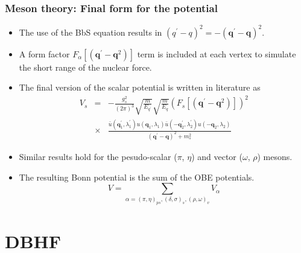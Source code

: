 \documentclass[10pt,serif]{beamer}
\newcommand{\bvec}[1]{\boldsymbol{#1}}
\newcommand{\rb}[1]{\left(#1\right)}
\begin{document}
\begin{frame}
\frametitle{Meson theory: Final form for the potential}
\begin{itemize}
\item The use of the BbS equation results in $\rb{q^\prime - q}^2=-\rb{\bvec{q}^\prime-\bvec{q}}^2$.
\item A form factor $F_\alpha \left[ \rb{\bvec{q}^\prime - \bvec{q}^2} \right]$ term is included at each vertex to simulate the short range of the nuclear force.
\item The final version of the scalar potential is written in literature as
\begin{eqnarray}
V_{s}&=&-\frac{g^2_{s}}{\rb{2 \pi}^3} \sqrt{\frac{m}{E_{q^\prime}}} \sqrt{\frac{m}{E_{q}}} \rb{F_s \left[ \rb{\bvec{q}^\prime - \bvec{q}^2} \right] }^2 \nonumber \\
&\times&\frac{\bar{u} \rb{\bvec{q}_1^\prime,\lambda_1^\prime} u \rb{\bvec{q}_1,\lambda_1} \bar{u} \rb{\bvec{-q}_2^\prime,\lambda_2^\prime} u \rb{\bvec{-q}_2,\lambda_2}}{(\bvec{q}^\prime - \bvec{q})^2 + m^2_{s}}
\end{eqnarray}
\item Similar results hold for the pesudo-scalar ($\pi$, $\eta$) and vector ($\omega$, $\rho$) mesons.
\item The resulting Bonn potential is the sum of the OBE potentials.
\begin{equation}
V = \sum_{\alpha=\rb{\pi,\eta}_{ps},\rb{\delta,\sigma}_{s},\rb{\rho,\omega}_{v}} V_{\alpha}
\end{equation}
\end{itemize}
\end{frame}
\section{DBHF}
\end{document}
